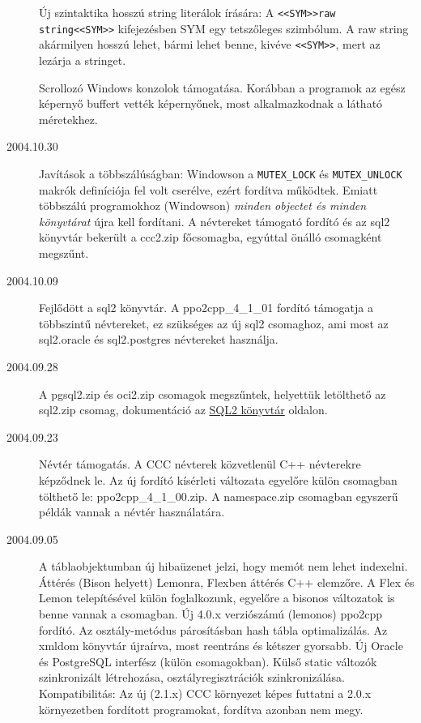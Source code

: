 \begin{description}
    Új szintaktika hosszú string literálok írására: 
    A \verb!<<SYM>>raw string<<SYM>>! kifejezésben SYM egy tetszőleges
    szimbólum. A raw string akármilyen hosszú lehet, bármi
    lehet benne, kivéve \verb!<<SYM>>!, mert az lezárja a stringet.

    Scrollozó Windows konzolok támogatása. Korábban a programok
    az egész képernyő buffert vették képernyőnek, most alkalmazkodnak
    a látható méretekhez.
\item[2004.10.30]
    Javítások a többszálúságban: Windowson a \verb!MUTEX_LOCK! és
    \verb!MUTEX_UNLOCK! makrók definíciója fel volt cserélve, 
    ezért fordítva működtek. Emiatt többszálú programokhoz (Windowson) 
    {\em minden objectet és minden könyvtárat\/} újra kell fordítani.
    A névtereket támogató fordító és az sql2 könyvtár 
    bekerült a ccc2.zip főcsomagba, egyúttal önálló csomagként megszűnt.
\item[2004.10.09]
    Fejlődött a  sql2 könyvtár.
    A ppo2cpp\_4\_1\_01  fordító támogatja a többszintű névtereket, 
    ez szükséges az új sql2 csomaghoz, 
    ami most az sql2.oracle és sql2.postgres névtereket használja.

\item[2004.09.28]
    A pgsql2.zip és oci2.zip csomagok megszűntek, 
    helyettük letölthető az  sql2.zip csomag,  dokumentáció az 
    \href{http://ok.comfirm.hu/ccc2/sql2.html}{SQL2 könyvtár} oldalon.

\label{NAMESPACE}
\item[2004.09.23]
    Névtér támogatás.
    A CCC névterek közvetlenül C++ névterekre képződnek le.
    Az új fordító kísérleti változata egyelőre külön csomagban tölthető le:
    ppo2cpp\_4\_1\_00.zip.
    A namespace.zip csomagban egyszerű példák vannak a névtér használatára.

\item[2004.09.05]
    A táblaobjektumban új hibaüzenet jelzi, hogy memót nem lehet indexelni.
    Áttérés (Bison helyett) Lemonra, Flexben áttérés C++ elemzőre.
    A Flex és Lemon  telepítésével külön foglalkozunk,
    egyelőre a bisonos változatok is benne vannak a csomagban.
    Új 4.0.x verziószámú (lemonos) ppo2cpp fordító. 
    Az osztály-metódus párosításban hash tábla optimalizálás.
    Az xmldom könyvtár újraírva, most reentráns és kétszer gyorsabb.
    Új Oracle és PostgreSQL interfész (külön csomagokban).
    Külső static változók szinkronizált létrehozása,
    osztályregisztrációk szinkronizálása.
    Kompatibilitás: Az új (2.1.x) CCC környezet képes
    futtatni a 2.0.x környezetben fordított programokat,
    fordítva azonban nem megy.


\end{description}
